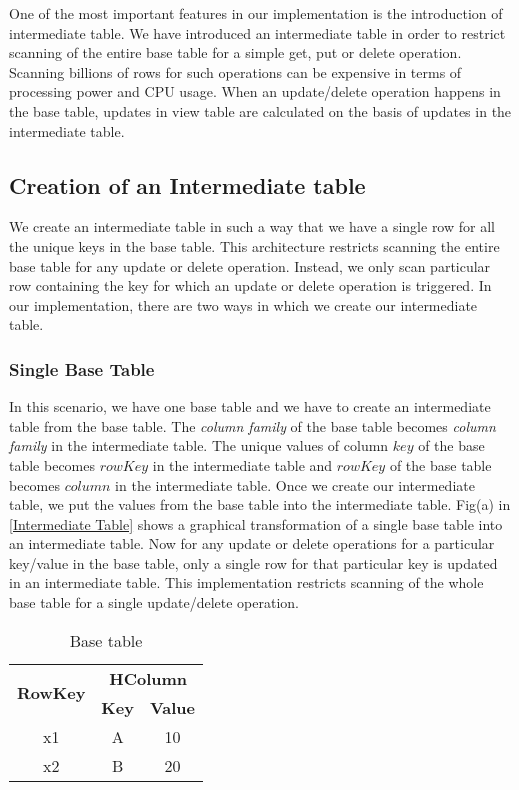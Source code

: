 \documentclass[11pt,a4paper,bibtotoc,idxtotoc,headsepline,footsepline,footexclude,BCOR12mm,DIV13]{scrbook}
\begin{document}
One of the most important features in our implementation is the introduction of intermediate table. We have introduced an intermediate table in order to restrict scanning of the entire base table for a simple get, put or delete operation. Scanning billions of rows for such operations can be expensive in terms of processing power and CPU usage. When an update/delete operation happens in the base table, updates in view table are calculated on the basis of updates in the intermediate table.

\subsection{Creation of an Intermediate table}
\label{subsec:intermediatetable}

We create an intermediate table in such a way that we have a single row for all the unique keys in the base table. This architecture restricts scanning the entire base table for any update or delete operation. Instead, we only scan particular row containing the key for which an update or delete operation is triggered. In our implementation, there are two ways in which we create our intermediate table.

\subsubsection{Single Base Table}
\label{Single Base Table}
In this scenario, we have one base table and we have to create an intermediate table from the base table. The \emph{column family} of the base table becomes \emph{column family} in the intermediate table. The unique values of column $key$ of the base table becomes $rowKey$ in the intermediate table and $rowKey$ of the base table becomes $column$ in the intermediate table. Once we create our intermediate table, we put the values from the base table into the intermediate table. Fig(a) in \ref{Intermediate Table} shows a graphical transformation of a single base table into an intermediate table. Now for any update or delete operations for a particular key/value in the base table, only a single row for that particular key is updated in an intermediate table. This implementation restricts scanning of the whole base table for a single update/delete operation.

\begin{table*}[htb!]
	\centering
	\begin{tabular}{|c|c|c|}
		\hline
		\multirow{2}{*}{\textbf{RowKey}} & \multicolumn{2}{c|}{\textbf{HColumn}}\\
		\cline{2-3}
		& \textbf{Key} & \textbf{Value}\\
		\hline
		x1 & A & 10\\
		\hline
		x2 & B & 20\\
	
		\hline
	\end{tabular}
	\caption{Base table}
	\label{table:BaseTable}
\end{table*}
\end{document}
